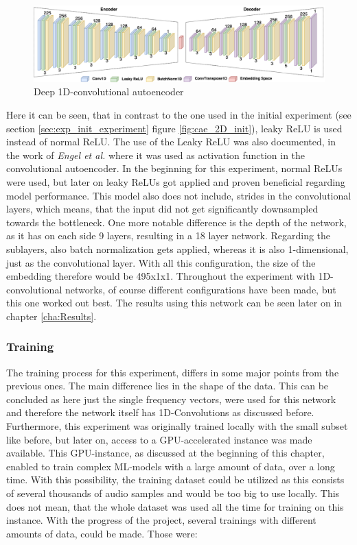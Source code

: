 \begin{figure}[htb!]
	\caption{Deep 1D-convolutional autoencoder}
	\label{fig:cae_1D}
	\centering
	\includegraphics[width=\textwidth]{images/experiments/autoencoder_deep_1D.png}
\end{figure}

Here it can be seen, that in contrast to the one used in the initial experiment (see section \ref{sec:exp_init_experiment} figure \ref{fig:cae_2D_init}), leaky ReLU is used instead of normal ReLU. The use of the Leaky ReLU was also documented, in the work of \textit{Engel et al.} \cite{Engel2017} where it was used as activation function in the convolutional autoencoder. In the beginning for this experiment, normal ReLUs were used, but later on leaky ReLUs got applied and proven beneficial regarding model performance. This model also does not include, strides in the convolutional layers, which means, that the input did not get significantly downsampled towards the bottleneck. One more notable difference is the depth of the network, as it has on each side 9 layers, resulting in a 18 layer network. Regarding the sublayers, also batch normalization gets applied, whereas it is also 1-dimensional, just as the convolutional layer. With all this configuration, the size of the embedding therefore would be 495x1x1. Throughout the experiment with 1D-convolutional networks, of course different configurations have been made, but this one worked out best. The results using this network can be seen later on in chapter \ref{cha:Results}.

\subsubsection{Training}
The training process for this experiment, differs in some major points from the previous ones. The main difference lies in the shape of the data. This can be concluded as here just the single frequency vectors, were used for this network and therefore the network itself has 1D-Convolutions as discussed before. Furthermore, this experiment was originally trained locally with the small subset like before, but later on, access to a GPU-accelerated instance was made available. This GPU-instance, as discussed at the beginning of this chapter, enabled to train complex ML-models with a large amount of data, over a long time. With this possibility, the training dataset could be utilized as this consists of several thousands of audio samples and would be too big to use locally. This does not mean, that the whole dataset was used all the time for training on this instance. With the progress of the project, several trainings with different amounts of data, could be made. Those were:\\

